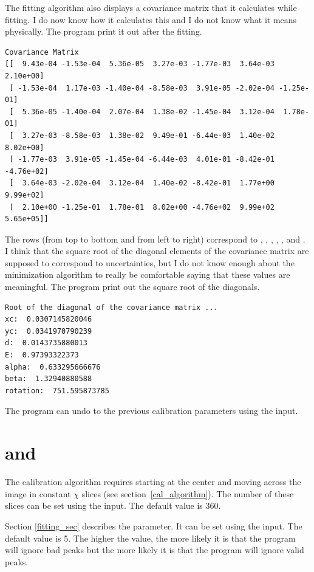 The fitting algorithm also displays a covariance matrix that 
it calculates while fitting. I do now know how it calculates this 
and I do not know what it means physically. 
The program print it out after the fitting. 
\begin{lstlisting}[basicstyle=\ttfamily\footnotesize]
Covariance Matrix
[[  9.43e-04 -1.53e-04  5.36e-05  3.27e-03 -1.77e-03  3.64e-03  2.10e+00]
 [ -1.53e-04  1.17e-03 -1.40e-04 -8.58e-03  3.91e-05 -2.02e-04 -1.25e-01]
 [  5.36e-05 -1.40e-04  2.07e-04  1.38e-02 -1.45e-04  3.12e-04  1.78e-01]
 [  3.27e-03 -8.58e-03  1.38e-02  9.49e-01 -6.44e-03  1.40e-02  8.02e+00]
 [ -1.77e-03  3.91e-05 -1.45e-04 -6.44e-03  4.01e-01 -8.42e-01 -4.76e+02]
 [  3.64e-03 -2.02e-04  3.12e-04  1.40e-02 -8.42e-01  1.77e+00  9.99e+02]
 [  2.10e+00 -1.25e-01  1.78e-01  8.02e+00 -4.76e+02  9.99e+02  5.65e+05]]
\end{lstlisting}
The rows (from top to bottom and from left to right) correspond 
to , , 
, , , and . 
I think that the square root of the diagonal elements of the covariance 
matrix are supposed to correspond to uncertainties, but I do not know 
enough about the minimization algorithm to really be comfortable saying 
that these values are meaningful. The program print out the square root of 
the diagonals. 
\begin{lstlisting}
Root of the diagonal of the covariance matrix ... 
xc:  0.0307145820046
yc:  0.0341970790239
d:  0.0143735880013
E:  0.97393322373
alpha:  0.633295666676
beta:  1.32940880588
rotation:  751.595873785
\end{lstlisting}
The program can undo to the previous calibration
parameters using the  input.

\section{\texorpdfstring{ 
        and }{``Number of 
        Chi'' and ``Stddev?''}}
        \label{num_chi_and_stddev}

The calibration algorithm requires starting
at the center and moving across the image in constant
$\chi$ slices (see section~\ref{cal_algorithm}).
The number of these slices 
can be set using the  input. 
The default value is 360. 

Section \ref{fitting_sec} describes the  parameter.
It can be set using the 
 input. The default value is 5. The higher 
the value, the more likely it is that the program will ignore
bad peaks but the more likely it is that the program
will ignore valid peaks.

